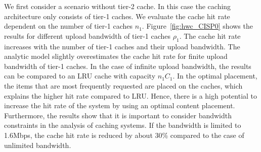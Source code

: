 
We first consider a scenario without tier-2 cache.
In this case the caching architecture only consists of tier-1 caches.
We evaluate the cache hit rate dependent on the number of tier-1 caches $n_1$.
Figure~\ref{fig:hwc_CISP0} shows the results for different upload bandwidth of tier-1 caches $\rho_1$.
The cache hit rate increases with the number of tier-1 caches and their upload bandwidth.
The analytic model slightly overestimates the cache hit rate for finite upload bandwidth of tier-1 caches.
In the case of infinite upload bandwidth, the results can be compared to an LRU cache with capacity $n_1 C_1$.
In the optimal placement, the items that are most frequently requested are placed on the caches, which explains the higher hit rate compared to LRU.
Hence, there is a high potential to increase the hit rate of the system by using an optimal content placement.
Furthermore, the results show that it is important to consider bandwidth constraints in the analysis of caching systems.
If the bandwidth is limited to 1.6Mbps, the cache hit rate is reduced by about 30\% compared to the case of unlimited bandwidth.



